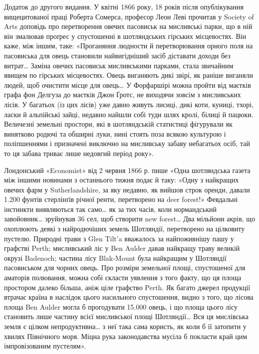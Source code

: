 {Додаток до другого видання. У квітні 1866 року, 18 років після
опублікування вищецитованої праці Роберта Сомерса, професор Леон
Леві прочитав у Society of Arts доповідь про перетворення овечих пасовиськ
на мисливські парки, що в ній він змалював проґрес у спустошенні
в шотляндських гірських місцевостях. Він каже, між іншим, таке: «Проганяння
людности й перетворювання орного поля на пасовиська для
овець становили найвигідніший засіб діставати доходи без витрат\dots{} Заміна
овечих пасовиськ мисливськими парками, стала звичайним явищем
по гірських місцевостях. Овець виганяють дикі звірі, як раніше виганяли
людей, щоб очистити місце для овець\dots{} У Форфаршірі можна пройти
від маєтків графа фон Делгуза до маєтків Джон Ґротс, не виходячи
зовсім з мисливських лісів. У багатьох (із цих лісів) уже давно живуть
лисиці, дикі коти, куниці, тхорі, ласки й альпійські зайці, недавно
найшли собі туди шлях кролі, білиці й пацюки. Величезні земельні простори,
які в шотляндській статистиці фігурували як винятково родючі
та обширні луки, нині стоять поза всякою культурою і поліпшеннями і
призначені виключно на мисливську забаву небагатьох осіб, тай то ця
забава триває лише недовгий період року».

Лондонський «Economist» від 2 червня 1866 р. пише «Одна шотляндська
газета між іншими новинами з останнього тижня подає й таку:
«Одну з найкращих овечих фарм у Sutherlandshire, за яку недавно, як
вийшов строк оренди, давали 1.200 фунтів стерлінґів річної ренти, перетворено
на deer forest!» Февдальні інстинкти виявляються так само\dots{}
як за тих часів, коли нормандський завойовник\dots{} зруйнував 36 сел, щоб
створити new forest\dots{} Два мільйони акрів, що охоплюють деякі з найродючіших
земель Шотляндії, перетворено на цілковиту пустелю. Природні
трави з Glen Tilt’a вважалось за найпоживнішу пашу у графстві Perth;
мисливський ліс у Ben Aulder давав найкращу траву великій окрузі
Badenoch; частина лісу Blak-Mount була найкращим у Шотляндії пасовиськом
для чорних овець. Про розміри земельної площі, спустошеної
для аматорів полювання, можна собі скласти уявлення з того факту, що
ця площа простором далеко більша, аніж ціле графство Perth. Як багато
джерел продукції втрачає країна в наслідок цього насильного спустошення,
видно з того, що лісова площа Ben Aulder могла б прогодувати
15.000 овець, і що площа цього лісу становить лише  частину всієї
мисливської площі Шотляндії\dots{} Вся ця мислівська земля є цілком непродуктивна\dots{}
з неї така сама користь, як коли б її затопити у хвилях
Північного моря. Міцна рука законодавства мусіла б покласти край цим
імпровізованим пустелям».
}

